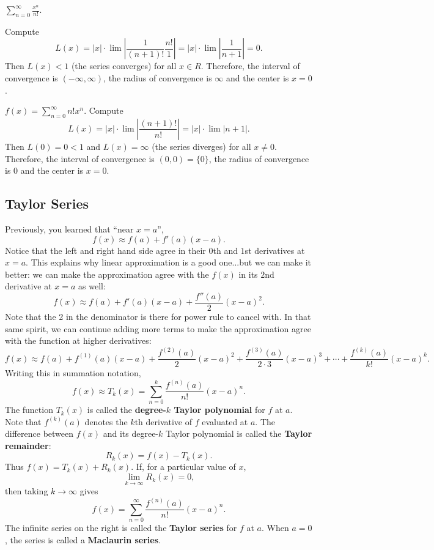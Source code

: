 \begin{exampleblock}
$\displaystyle\sum_{n=0}^\infty \frac{x^n}{n!}$.

Compute
$$L(x)=|x|\cdot\lim\left|\frac{1}{(n+1)!}\frac{n!}{1}\right|=|x|\cdot\lim\left|\frac{1}{n+1}\right|=0.$$
Then $L(x)<1$ (the series converges) for all $x\in R$. Therefore, the interval of convergence is $(-\infty,\infty)$, the radius of convergence is $\infty$ and the center is $x=0$.
\end{exampleblock}

\begin{exampleblock}
$f(x)=\displaystyle\sum_{n=0}^\infty n! x^n$.
Compute
$$L(x)=|x|\cdot\lim\left|\frac{(n+1)!}{n!}\right|=|x|\cdot\lim\left|n+1\right|.$$
Then $L(0)=0<1$ and $L(x)=\infty$ (the series diverges) for all $x\neq 0$. Therefore, the interval of convergence is $(0,0)=\{0\}$, the radius of convergence is $0$ and the center is $x=0$.
\end{exampleblock}


\subsection{Taylor Series}

Previously, you learned that ``near $x=a$'',
$$f(x)\approx f(a)+f'(a)(x-a).$$
Notice that the left and right hand side agree in their $0$th and $1$st derivatives at $x=a$. This explains why linear approximation is a good one...but we can make it better: we can make the approximation agree with the $f(x)$ in its $2$nd derivative at $x=a$ as well:
$$f(x)\approx f(a)+f'(a)(x-a)+\frac{f''(a)}{2}(x-a)^2.$$
Note that the 2 in the denominator is there for power rule to cancel with. In that same spirit, we can continue adding more terms to make the approximation agree with the function at higher derivatives:
$$f(x) \approx f(a)+f^{(1)}(a)(x-a)+\frac{f^{(2)}(a)}{2}(x-a)^2+\frac{f^{(3)}(a)}{2\cdot 3}(x-a)^3+\cdots+\frac{f^{(k)}(a)}{k!}(x-a)^k.$$
Writing this in summation notation,
$$f(x)\approx T_k(x)=\sum_{n=0}^k\frac{f^{(n)}(a)}{n!}(x-a)^n.$$
The function $T_k(x)$ is called the \textbf{degree-$k$ Taylor polynomial} for $f$ at $a$. Note that $f^{(k)}(a)$ denotes the $k$th derivative of $f$ evaluated at $a$. The difference between $f(x)$ and its degree-$k$ Taylor polynomial is called the \textbf{Taylor remainder}:
$$R_k(x)=f(x)-T_k(x).$$
Thus $f(x)=T_k(x)+R_k(x)$. If, for a particular value of $x$,
$$\lim_{k\to\infty}R_k(x)=0,$$
then taking $k\to\infty$ gives
$$f(x)= \sum_{n=0}^\infty\frac{f^{(n)}(a)}{n!}(x-a)^n.$$
The infinite series on the right is called the \textbf{Taylor series} for $f$ at $a$. When $a=0$, the series is called a \textbf{Maclaurin series}.

